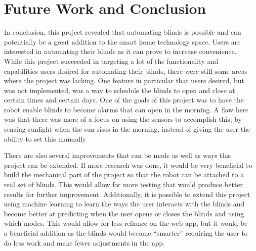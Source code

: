\documentclass[10pt,twocolumn]{article}
\begin{document}
\section{Future Work and Conclusion}
In conclusion, this project revealed that automating blinds is possible and can potentially be a great addition to the smart home technology space. Users are interested in automating their blinds as it can prove to increase convenience. While this project succeeded in targeting a lot of the functionality and capabilities users desired for automating their blinds, there were still some areas where the project was lacking. One feature in particular that users desired, but was not implemented, was a way to schedule the blinds to open and close at certain times and certain days. One of the goals of this project was to have the robot enable blinds to become alarms that can open in the morning. A flaw here was that there was more of a focus on using the sensors to accomplish this, by sensing sunlight when the sun rises in the morning, instead of giving the user the ability to set this manually

There are also several improvements that can be made as well as ways this project can be extended. If more research was done, it would be very beneficial to build the mechanical part of the project so that the robot can be attached to a real set of blinds. This would allow for more testing that would produce better results for further improvement. Additionally, it is possible to extend this project using machine learning to learn the ways the user interacts with the blinds and become better at predicting when the user opens or closes the blinds and using which modes. This would allow for less reliance on the web app, but it would be a beneficial addition as the blinds would become “smarter” requiring the user to do less work and make fewer adjustments in the app.

\printbibliography
\end{document}
